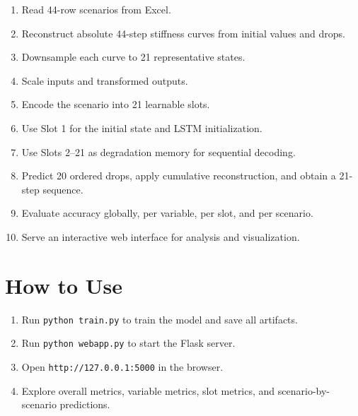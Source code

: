 \documentclass[11pt,a4paper]{article}
\begin{document}
\begin{enumerate}[nosep]
    \item Read 44-row scenarios from Excel.
    \item Reconstruct absolute 44-step stiffness curves from initial values and drops.
    \item Downsample each curve to 21 representative states.
    \item Scale inputs and transformed outputs.
    \item Encode the scenario into 21 learnable slots.
    \item Use Slot 1 for the initial state and LSTM initialization.
    \item Use Slots 2--21 as degradation memory for sequential decoding.
    \item Predict 20 ordered drops, apply cumulative reconstruction, and obtain a 21-step sequence.
    \item Evaluate accuracy globally, per variable, per slot, and per scenario.
    \item Serve an interactive web interface for analysis and visualization.
\end{enumerate}

\section{How to Use}

\begin{enumerate}[nosep]
    \item Run \texttt{python train.py} to train the model and save all artifacts.
    \item Run \texttt{python webapp.py} to start the Flask server.
    \item Open \texttt{http://127.0.0.1:5000} in the browser.
    \item Explore overall metrics, variable metrics, slot metrics, and scenario-by-scenario predictions.
\end{enumerate}
\end{document}
